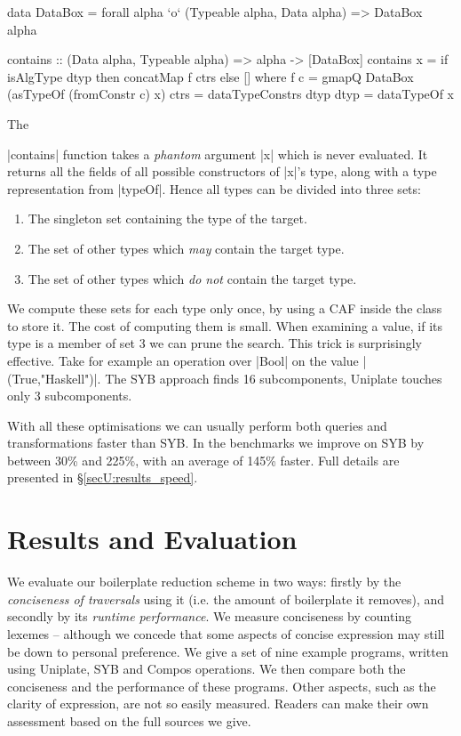 \begin{onepage}
\ignore\begin{code}
data DataBox = forall alpha `o` (Typeable alpha, Data alpha) => DataBox alpha

contains :: (Data alpha, Typeable alpha) => alpha -> [DataBox]
contains x = if isAlgType dtyp then concatMap f ctrs else []
    where
        f c = gmapQ DataBox (asTypeOf (fromConstr c) x)
        ctrs = dataTypeConstrs dtyp
        dtyp = dataTypeOf x
\end{code}
\end{onepage}

The \ignore|contains| function takes a \textit{phantom} argument |x| which is never evaluated. It returns all the fields of all possible constructors of |x|'s type, along with a type representation from |typeOf|. Hence all types can be divided into three sets:

\begin{enumerate}
\item The singleton set containing the type of the target.
\item The set of other types which \textit{may} contain the target type.
\item The set of other types which \textit{do not} contain the target type.
\end{enumerate}

We compute these sets for each type only once, by using a CAF inside the class to store it. The cost of computing them is small. When examining a value, if its type is a member of set 3 we can prune the search. This trick is surprisingly effective. Take for example an operation over |Bool| on the value |(True,"Haskell")|. The SYB approach finds 16 subcomponents, Uniplate touches only 3 subcomponents.

With all these optimisations we can usually perform both queries and transformations faster than SYB. In the benchmarks we improve on SYB by between 30\% and 225\%, with an average of 145\% faster. Full details are presented in \S\ref{secU:results_speed}.


\section{Results and Evaluation}
\label{secU:results}

We evaluate our boilerplate reduction scheme in two ways: firstly by the \textit{conciseness of traversals} using it (i.e. the amount of boilerplate it removes), and secondly by its \textit{runtime performance}. We measure conciseness by counting lexemes -- although we concede that some aspects of concise expression may still be down to personal preference. We give a set of nine example programs, written using Uniplate, SYB and Compos operations. We then compare both the conciseness and the performance of these programs. Other aspects, such as the clarity of expression, are not so easily measured. Readers can make their own assessment based on the full sources we give.

